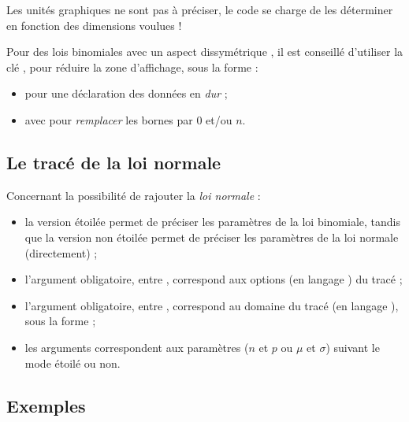 \begin{importantblock}
Les unités graphiques ne sont pas à préciser, le code se charge de les déterminer en fonction des dimensions voulues !

Pour des lois binomiales avec un aspect \og dissymétrique \fg, il est conseillé d'utiliser la clé , pour réduire la zone d'affichage, sous la forme :

\begin{itemize}
	\item {} pour une déclaration des données en \textit{dur} ;
	\item avec \ctex{*} pour \textit{remplacer} les bornes par $0$ et/ou $n$.
\end{itemize}
\vspace*{-\baselineskip}\leavevmode
\end{importantblock}

\subsection{Le tracé de la loi normale}

\begin{tipblock}
Concernant la possibilité de rajouter la \textit{loi normale} :

\begin{itemize}
	\item la version étoilée permet de préciser les paramètres de la loi binomiale, tandis que la version non étoilée permet de préciser les paramètres de la loi normale (directement) ;
	\item l'argument obligatoire, entre \ctex{[...]}, correspond aux options (en langage \TikZ) du tracé ;
	\item l'argument obligatoire, entre , correspond au domaine du tracé (en langage ), sous la forme  ;
	\item les arguments correspondent aux paramètres ($n$ et $p$ ou $\mu$ et $\sigma$) suivant le mode étoilé ou non.
\end{itemize}
\vspace*{-\baselineskip}\leavevmode
\end{tipblock}

\subsection{Exemples}

\begin{PresCodePL}{}
\end{PresCodePL}

